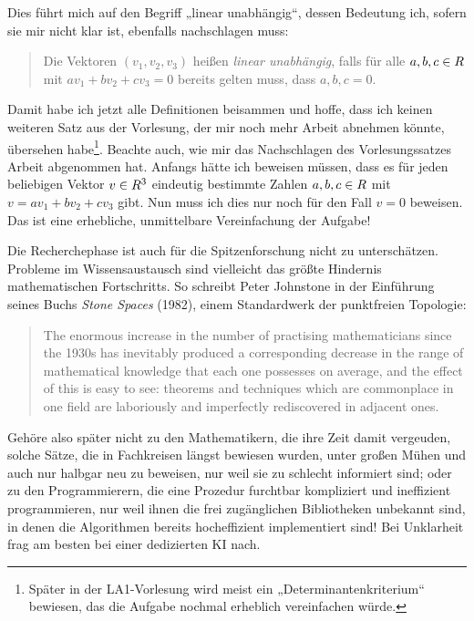 \begin{phaseone}[Recherche]
\begin{quote}
    \end{quote}
    Dies führt mich auf den Begriff „linear unabhängig“, dessen Bedeutung ich, sofern sie mir nicht klar ist, ebenfalls nachschlagen muss:
    \begin{quote}
        Die Vektoren $(v_1,v_2,v_3)$ heißen \emph{linear unabhängig}, falls für alle $a,b,c\in \relax R$ mit $av_1+bv_2+cv_3=0$ bereits gelten muss, dass $a,b,c=0$.
    \end{quote}
    Damit habe ich jetzt alle Definitionen beisammen und hoffe, dass ich keinen weiteren Satz aus der Vorlesung, der mir noch mehr Arbeit abnehmen könnte, übersehen habe\footnote{Später in der LA1-Vorlesung wird meist ein „Determinantenkriterium“ bewiesen, das die Aufgabe nochmal erheblich vereinfachen würde.}. Beachte auch, wie mir das Nachschlagen des Vorlesungssatzes Arbeit abgenommen hat. Anfangs hätte ich beweisen müssen, dass es für jeden beliebigen Vektor $v\in \relax R^3$ eindeutig bestimmte Zahlen $a,b,c\in \relax R$ mit $v=av_1+bv_2+cv_3$ gibt. Nun muss ich dies nur noch für den Fall $v=0$ beweisen. Das ist eine erhebliche, unmittelbare Vereinfachung der Aufgabe!
\end{phaseone}


\begin{bem}
    Die Recherchephase ist auch für die Spitzenforschung nicht zu unterschätzen. Probleme im Wissensaustausch sind vielleicht das größte Hindernis mathematischen Fortschritts. So schreibt Peter Johnstone in der Einführung seines Buchs \emph{Stone Spaces} (1982), einem Standardwerk der punktfreien Topologie:
    \begin{quote}
        The enormous increase in the number of practising mathematicians since the 1930s has inevitably produced a corresponding decrease in the range of mathematical knowledge that each one possesses on average, and the effect of this is easy to see: theorems and techniques which are commonplace in one field are laboriously and imperfectly rediscovered in adjacent ones.
    \end{quote}
    Gehöre also später nicht zu den Mathematikern, die ihre Zeit damit vergeuden, solche Sätze, die in Fachkreisen längst bewiesen wurden, unter großen Mühen und auch nur halbgar neu zu beweisen, nur weil sie zu schlecht informiert sind; oder zu den Programmierern, die eine Prozedur furchtbar kompliziert und ineffizient programmieren, nur weil ihnen die frei zugänglichen Bibliotheken unbekannt sind, in denen die Algorithmen bereits hocheffizient implementiert sind! Bei Unklarheit frag am besten bei einer dedizierten KI nach.
\end{bem}


